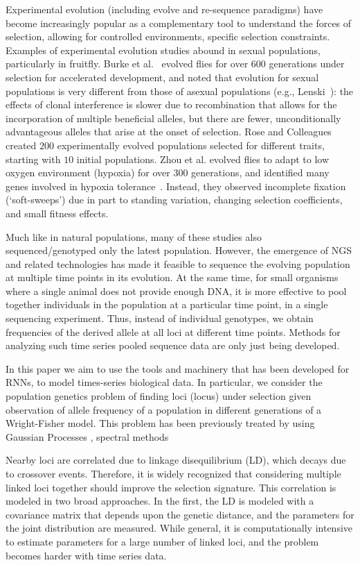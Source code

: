 Experimental evolution (including evolve and re-sequence paradigms)
have become increasingly popular as a complementary tool to understand
the forces of selection, allowing for controlled environments,
specific selection constraints. Examples of experimental evolution
studies abound in sexual populations, particularly in fruitfly. Burke
et al.~\cite{Burke2010} evolved flies for over $600$ generations under
selection for accelerated development, and noted that evolution for
sexual populations is very different from those of asexual populations
(e.g., Lenski~\cite{}): the effects of clonal interference is slower
due to recombination that allows for the incorporation of multiple
beneficial alleles, but there are fewer, unconditionally advantageous
alleles that arise at the onset of selection. Rose and
Colleagues~\cite{Rose} created $200$ experimentally evolved
populations selected for different traits, starting with $10$ initial
populations. Zhou et al. evolved flies to adapt to low oxygen
environment (hypoxia) for over $300$ generations, and identified many
genes involved in hypoxia tolerance~\cite{}.  Instead, they observed
incomplete fixation (`soft-sweeps') due in part to standing variation,
changing selection coefficients, and small fitness effects.

Much like in natural populations, many of these studies also
sequenced/genotyped only the latest population. However, the emergence
of NGS and related technologies has made it feasible to sequence the
evolving population at multiple time points in its evolution. At the
same time, for small organisms where a single animal does not provide
enough DNA, it is more effective to pool together individuals in the
population at a particular time point, in a single sequencing
experiment. Thus, instead of individual genotypes, we obtain
frequencies of the derived allele at all loci at different time
points. Methods for analyzing such time series pooled sequence data
are only just being developed.


In this paper we aim to use the tools and machinery that has been
developed for RNNs, to model times-series biological data. In
particular, we consider the population genetics problem of finding
loci (locus) under selection given observation of allele frequency of
a population in different generations of a Wright-Fisher model. This
problem has been previously treated by using Gaussian Processes
\cite{Terhorst15}, spectral methods \cite{Song14}


Nearby loci are correlated due to linkage disequilibrium (LD), which
decays due to crossover events. Therefore, it is widely recognized
that considering multiple linked loci together should improve the
selection signature. This correlation is modeled in two broad
approaches. In the first, the LD is modeled with a covariance matrix
that depends upon the genetic distance, and the parameters for the
joint distribution are measured. While general, it is computationally
intensive to estimate parameters for a large number of linked loci, and the problem becomes harder with time series data. 


